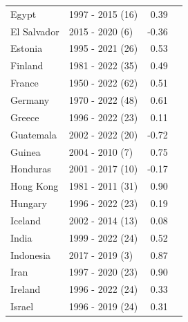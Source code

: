 \begin{table}[pos=h]
{{\begin{tabular}{llrr}
Egypt & 1997 - 2015 (16) & 0.39\\
\addlinespace
El Salvador & 2015 - 2020 (6) & -0.36\\
Estonia & 1995 - 2021 (26) & 0.53\\
Finland & 1981 - 2022 (35) & 0.49\\
France & 1950 - 2022 (62) & 0.51\\
Germany & 1970 - 2022 (48) & 0.61\\
\addlinespace
Greece & 1996 - 2022 (23) & 0.11\\
Guatemala & 2002 - 2022 (20) & -0.72\\
Guinea & 2004 - 2010 (7) & 0.75\\
Honduras & 2001 - 2017 (10) & -0.17\\
Hong Kong & 1981 - 2011 (31) & 0.90\\
\addlinespace
Hungary & 1996 - 2022 (23) & 0.19\\
Iceland & 2002 - 2014 (13) & 0.08\\
India & 1999 - 2022 (24) & 0.52\\
Indonesia & 2017 - 2019 (3) & 0.87\\
Iran & 1997 - 2020 (23) & 0.90\\
\addlinespace
Ireland & 1996 - 2022 (24) & 0.33\\
Israel & 1996 - 2019 (24) & 0.31\\ \end{tabular}
}

}
\end{table}
